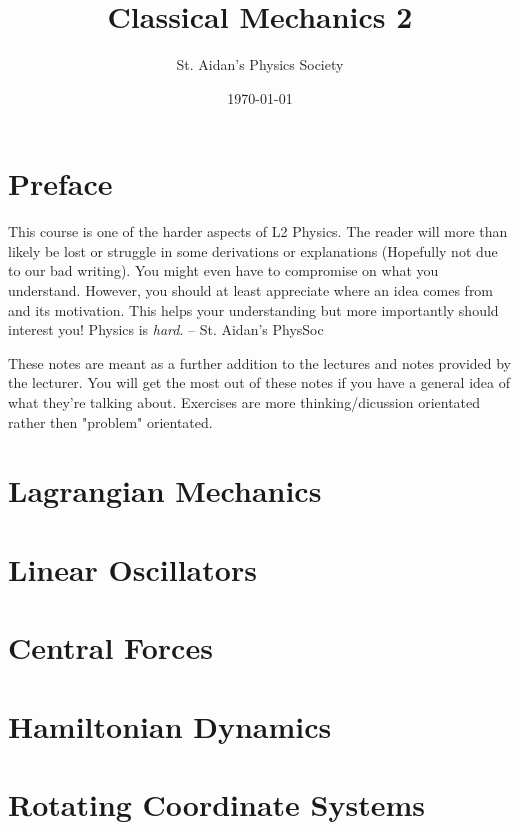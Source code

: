 \documentclass[10pt,%
               a4paper]{physics_notes}
\begin{document}
\title{Classical Mechanics 2}
\author{St. Aidan's Physics Society}
\date{\today}
\maketitle

\tableofcontents
\newpage

\section{Preface}
This course is one of the harder aspects of L2 Physics. The reader will more than likely be lost or struggle in some derivations or explanations (Hopefully not due to our bad writing). You might even have to compromise on what you understand. However, you should at least appreciate where an idea comes from and its motivation. This helps your understanding but more importantly should interest you! Physics is \textit{hard}. -- St. Aidan's PhysSoc\par



These notes are meant as a further addition to the lectures and notes provided by the lecturer. You will get the most out of these notes if you have a general idea of what they're talking about. Exercises are more thinking/dicussion orientated rather then "problem" orientated. 
\newpage

\section{Lagrangian Mechanics}


\section{Linear Oscillators}



\section{Central Forces}


\section{Hamiltonian Dynamics}


\section{Rotating Coordinate Systems}


 
\end{document}
